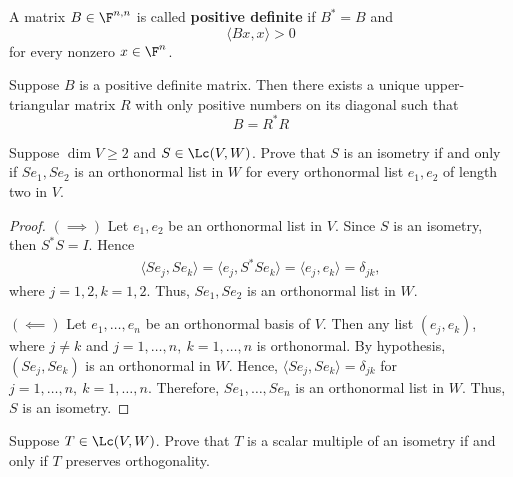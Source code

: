 \documentclass{extarticle}
\begin{document}
\begin{definition}
    A matrix \(B \in \F^{n, n}\) is called \textbf{positive definite} if \(B^* = B\) and
    \[\langle Bx,x \rangle > 0\]
    for every nonzero \(x \in \F^n\).
\end{definition}

\begin{thm}
    Suppose \(B\) is a positive definite matrix. Then there exists a unique upper-triangular
    matrix \(R\) with only positive numbers on its diagonal such that
    \[B = R^* R\]
\end{thm}


\newpage
{}

\begin{problem}{1}
    Suppose \(\dim V \geq 2\) and \(S \in \Lc(V, W)\). Prove that \(S\) is an isometry if
    and only if \(S e_1, S e_2\) is an orthonormal list in \(W\) for every orthonormal
    list \(e_1, e_2\) of length two in \(V\).
\end{problem}

\begin{proof}
    $(\implies)$ Let \( e_1, e_2 \) be an orthonormal list in \( V \).
    Since \( S \) is an isometry, then \( S^* S = I \). Hence
    \begin{gather*}
        \langle S e_j, S e_k \rangle  = \langle e_j, S^* S e_k \rangle =
        \langle e_j, e_k \rangle = \delta_{j k},
    \end{gather*}
    where \( j = 1, 2, k = 1, 2 \). Thus, \( S e_1, S e_2 \) is an orthonormal list in \( W \).

    $(\impliedby)$ Let \( e_1, \dots, e_n \) be an orthonormal basis of \( V \). Then
    any list \( (e_j, e_k) \), where \( j \ne k \) and \( j=1, \dots, n, \ k = 1, \dots, n\) is
    orthonormal. By hypothesis, \( (S e_j, S e_k) \) is an orthonormal in \( W \). Hence,
    \( \langle S e_j, S e_k \rangle = \delta_{j k}\) for  \( j=1, \dots, n, \ k = 1, \dots, n\).
    Therefore, \( S e_1, \dots, S e_n \) is an orthonormal list in \( W \). Thus, \( S \) is an
    isometry.
\end{proof}

\begin{problem}{2}
    Suppose \(T \in \Lc(V, W)\). Prove that \(T\) is a scalar multiple of an isometry if and only
    if \(T\) preserves orthogonality.
\end{problem}
\end{document}
